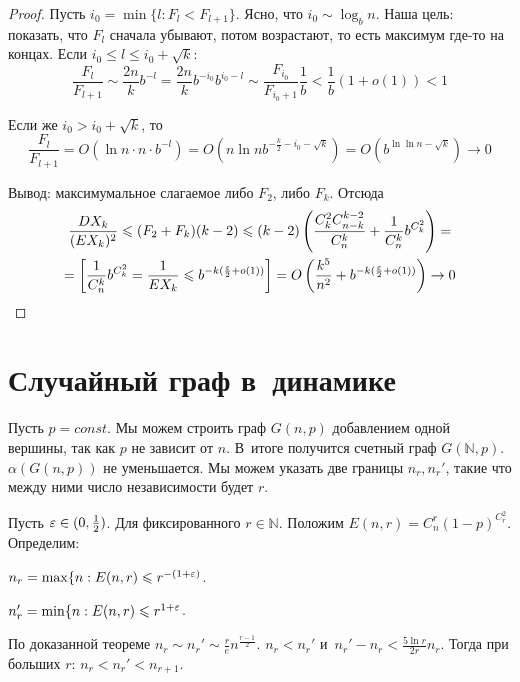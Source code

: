 \documentclass{article}
\begin{document}
\begin{proof}
	Пусть $i_0 = \min\{l: F_l < F_{l+1}\}$. Ясно, что $i_0 \sim \log_b n$. Наша цель: показать, что
	$F_l$ сначала убывают, потом возрастают, то есть максимум где-то на концах. Если $i_0 \le l \le
	i_0 + \sqrt{k}$:
	$$
		\frac{F_l}{F_{l+1}} \sim \frac{2n}{k} b^{-l} = \frac{2n}{k} b^{-i_0} b^{i_0 - l} \sim
		\frac{F_{i_0}}{F_{i_0 + 1}} \frac{1}{b} < \frac{1}{b} (1 + o(1)) < 1
	$$

	Если же $i_0 > i_0 + \sqrt{k}$, то
	$$
		\frac{F_l}{F_{l+1}} = O(\ln n \cdot n \cdot b^{-l}) = O(n \ln n b^{-\frac{k}{2} - i_0 -
		\sqrt{k}}) = O(b^{\ln \ln n -\sqrt{k}}) \rightarrow 0
	$$

	Вывод: максимумальное слагаемое либо $F_2$, либо $F_k$. Отсюда
	\begin{multline*}
		\frac{DX_k}{(EX_k)^2} \leqslant (F_2 + F_k) (k-2) \leqslant (k-2)\left(\frac{C_k^2 C_{n-k}^{k-2}}{C_n^k} +
		\frac{1}{C_n^k} b^{C_k^2}\right) =\\= \left[\frac{1}{C_n^k} b^{C_k^2} = \frac{1}{EX_k} \leqslant
		b^{-k(\frac{\varepsilon}{2}+o(1))}\right] = O\left(\frac{k^5}{n^2} + b^{-k(\frac{\varepsilon}{2} +
		o(1))}\right) \rightarrow 0
	\end{multline*}
\end{proof}

\section{Случайный граф в~динамике}
Пусть $p = const$. Мы можем строить граф $G(n, p)$ добавлением одной
вершины, так как $p$ не зависит от $n$. В~итоге получится счетный граф $G(\mathbb{N}, p)$.
$\alpha(G(n,p))$ не уменьшается. Мы можем указать две границы $n_r, n_r'$, такие что между ними
число независимости будет $r$.

Пусть $\varepsilon \in (0, \frac{1}{2})$. Для фиксированного $r \in \mathbb{N}$. Положим $E(n, r) =
C_n^r(1-p)^{C_r^2}$. Определим:

$n_r = \max\{n: E(n, r) \leqslant r^{-(1+\varepsilon)}$.

$n_r' = \min\{n: E(n, r) \leqslant r^{1+\varepsilon}$.

По доказанной теореме $n_r \sim n_r' \sim \frac{r}{e}n^{\frac{r-1}{2}}$. $n_r < n_r'$ и~$n_r' - n_r
< \frac{5\ln r}{2r} n_r$. Тогда при больших $r$: $n_r < n_r' < n_{r+1}$.
\end{document}

